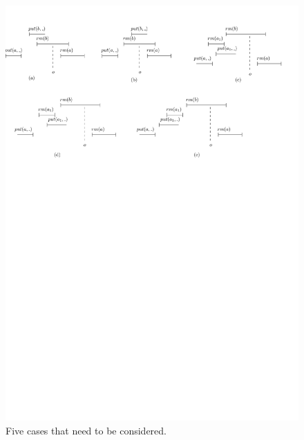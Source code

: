 \begin{figure}[htbp]
  \centering
  \includegraphics[width=0.8 \textwidth]{figures/PIC-HIS-FiveEnumerations.pdf}
  \caption{Five cases that need to be considered.}
  \label{fig:five enumerations}
\end{figure}



